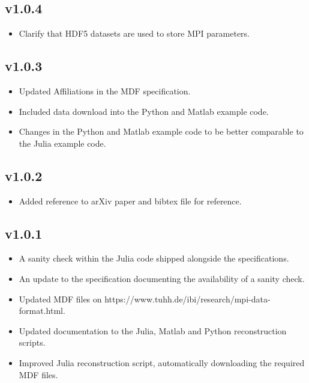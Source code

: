 \documentclass[landscape,a4paper]{article} %
\begin{document}
\begin{multicols}{2}
\subsection{v1.0.4}

\begin{itemize}
	\item Clarify that HDF5 datasets are used to store MPI parameters.
\end{itemize}


\subsection{v1.0.3}

\begin{itemize}
	\item Updated Affiliations in the MDF specification.
	\item Included data download into the Python and Matlab example code.
	\item Changes in the Python and Matlab example code to be better comparable to the Julia example code.
\end{itemize}


\subsection{v1.0.2}

\begin{itemize}
	\item Added reference to arXiv paper and bibtex file for reference.
\end{itemize}


\subsection{v1.0.1}

\begin{itemize}
	\item A sanity check within the Julia code shipped alongside the specifications.
	\item An update to the specification documenting the availability of a sanity check.
	\item Updated MDF files on https://www.tuhh.de/ibi/research/mpi-data-format.html.
	\item Updated documentation to the Julia, Matlab and Python reconstruction scripts.
	\item Improved Julia reconstruction script, automatically downloading the required MDF files.
\end{itemize}
\end{multicols}

\newpage


\end{document}
